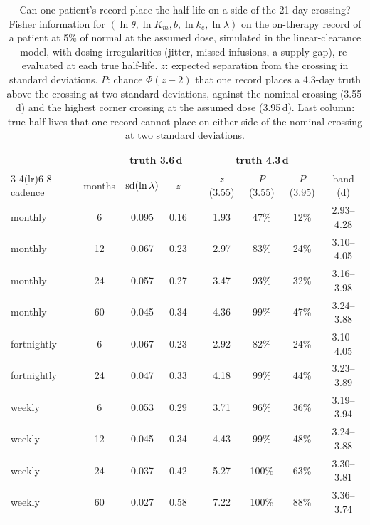\begin{table}[tbp]
\centering
\footnotesize
\caption{\label{stab:s6-record}Can one patient's record place the half-life on a side of the
21-day crossing? Fisher information for $(\ln\theta,\ln K_m,b,\ln k_e,\ln\lambda)$ on the
on-therapy record of a patient at 5\% of normal at the assumed dose, simulated in the
linear-clearance model, with dosing irregularities (jitter, missed
infusions, a supply gap), re-evaluated at each true half-life. $z$: expected separation from the
crossing in standard deviations. $P$: chance $\Phi(z-2)$ that one record places a 4.3-day truth
above the crossing at two standard deviations, against the nominal crossing (3.55\,d) and the
highest corner crossing at the assumed dose (3.95\,d). Last column: true half-lives that one record
cannot place on either side of the nominal crossing at two standard deviations.}
\begin{tabular}{@{}lcccccccc@{}}
\toprule
& & \multicolumn{2}{c}{truth 3.6\,d} & & \multicolumn{3}{c}{truth 4.3\,d} & \\
\cmidrule(lr){3-4}\cmidrule(lr){6-8}
cadence & months & $\operatorname{sd}(\ln \lambda)$ & $z$ & & $z$ (3.55) & $P$ (3.55) & $P$ (3.95) & band (d) \\
\midrule
monthly & 6 & 0.095 & 0.16 & & 1.93 & 47\% & 12\% & 2.93--4.28 \\
monthly & 12 & 0.067 & 0.23 & & 2.97 & 83\% & 24\% & 3.10--4.05 \\
monthly & 24 & 0.057 & 0.27 & & 3.47 & 93\% & 32\% & 3.16--3.98 \\
monthly & 60 & 0.045 & 0.34 & & 4.36 & 99\% & 47\% & 3.24--3.88 \\
fortnightly & 6 & 0.067 & 0.23 & & 2.92 & 82\% & 24\% & 3.10--4.05 \\
fortnightly & 24 & 0.047 & 0.33 & & 4.18 & 99\% & 44\% & 3.23--3.89 \\
weekly & 6 & 0.053 & 0.29 & & 3.71 & 96\% & 36\% & 3.19--3.94 \\
weekly & 12 & 0.045 & 0.34 & & 4.43 & 99\% & 48\% & 3.24--3.88 \\
weekly & 24 & 0.037 & 0.42 & & 5.27 & 100\% & 63\% & 3.30--3.81 \\
weekly & 60 & 0.027 & 0.58 & & 7.22 & 100\% & 88\% & 3.36--3.74 \\
\bottomrule
\end{tabular}
\end{table}
